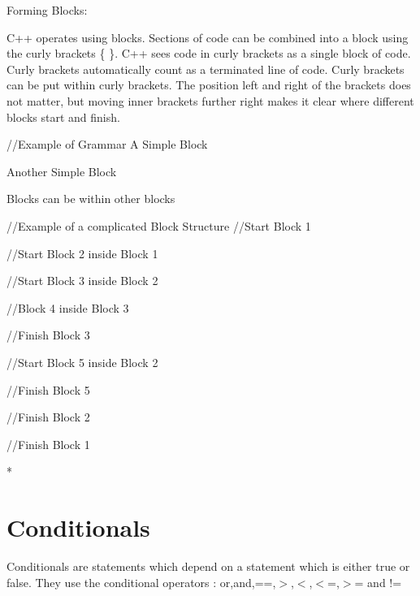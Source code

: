 \begin{DoxyItemize}
\item Forming Blocks: \par
 C++ operates using blocks. Sections of code can be combined into a block using the curly brackets \{ \}. C++ sees code in curly brackets as a single block of code. Curly brackets automatically count as a terminated line of code. Curly brackets can be put within curly brackets. The position left and right of the brackets does not matter, but moving inner brackets further right makes it clear where different blocks start and finish. 
\begin{DoxyCode}
 //Example of Grammar
 A Simple Block
 { }

 Another Simple Block
 {

 }

 Blocks can be within other blocks
 {
  { }
  { }
 }

 //Example of a complicated Block Structure
 //Start Block 1
 {

 //Start Block 2 inside Block 1
 {

        //Start Block 3 inside Block 2
        {

                //Block 4 inside Block 3
                {}

        //Finish Block 3
        }

        //Start Block 5 inside Block 2
        {

   //Finish Block 5
        }

 //Finish Block 2
 }

 //Finish Block 1
 }
*
\end{DoxyCode}

\end{DoxyItemize}\hypertarget{_programming_basics_BasicsPageConditionals}{}\section{Conditionals}\label{_programming_basics_BasicsPageConditionals}
Conditionals are statements which depend on a statement which is either true or false. They use the conditional operators : or,and,==,$>$,$<$,$<$=,$>$= and != \par


